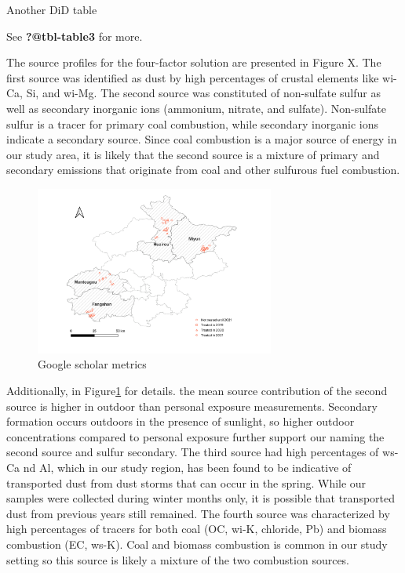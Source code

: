 \documentclass[
  letterpaper,
  DIV=11,
  numbers=noendperiod]{scrartcl}
\makeatletter
\renewenvironment{table}%
   {\renewcommand\familydefault\sfdefault
    \@float{table}}
   {\end@float}
\makeatother
\begin{document}
\begin{table}

\end{table}

Another DiD table

See \textbf{?@tbl-table3} for more.

\begin{table}

\end{table}

\newpage

The source profiles for the four-factor solution are presented in Figure
X. The first source was identified as dust by high percentages of
crustal elements like wi-Ca, Si, and wi-Mg. The second source was
constituted of non-sulfate sulfur as well as secondary inorganic ions
(ammonium, nitrate, and sulfate). Non-sulfate sulfur is a tracer for
primary coal combustion, while secondary inorganic ions indicate a
secondary source. Since coal combustion is a major source of energy in
our study area, it is likely that the second source is a mixture of
primary and secondary emissions that originate from coal and other
sulfurous fuel combustion.

\begin{figure}
\includegraphics[width=0.7\textwidth]{images/policy-implementation-map.png}
\caption{\label{fig-map}{Google scholar metrics}}
\end{figure}

Additionally, in Figure\ref{fig-map} for details. the mean source
contribution of the second source is higher in outdoor than personal
exposure measurements. Secondary formation occurs outdoors in the
presence of sunlight, so higher outdoor concentrations compared to
personal exposure further support our naming the second source and
sulfur secondary. The third source had high percentages of ws-Ca nd Al,
which in our study region, has been found to be indicative of
transported dust from dust storms that can occur in the spring. While
our samples were collected during winter months only, it is possible
that transported dust from previous years still remained. The fourth
source was characterized by high percentages of tracers for both coal
(OC, wi-K, chloride, Pb) and biomass combustion (EC, ws-K). Coal and
biomass combustion is common in our study setting so this source is
likely a mixture of the two combustion sources.
\end{document}
